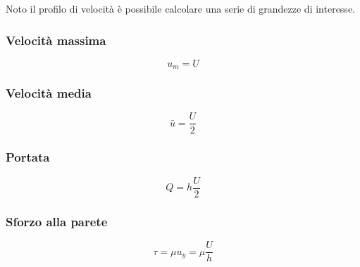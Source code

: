 Noto il profilo di velocità è possibile calcolare una serie di grandezze di interesse.

\subsubsection{Velocità massima}
%
	\begin{equation*}
		u_m = U
	\end{equation*}
%

\subsubsection{Velocità media}
%
	\begin{equation*}
		\bar{u} = \frac{U}{2}
	\end{equation*}
%

\subsubsection{Portata}
%
	\begin{equation*}
		Q = h \frac{U}{2}
	\end{equation*}
%

\subsubsection{Sforzo alla parete}
%
	\begin{equation*}
		\tau = \mu u_y = \mu \frac{U}{h}
	\end{equation*}
%

